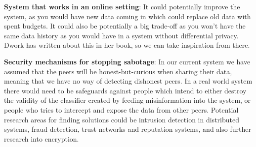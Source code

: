 \vspace{2mm}
\noindent
\textbf{System that works in an online setting}: It could potentially improve the system, as you would have new data coming in which could replace old data with spent budgets. It could also be potentially a big trade-off as you won't have the same data history as you would have in a system without differential privacy. Dwork has written about this in her book, so we can take inspiration from there. 

\vspace{2mm}
\noindent
\textbf{Security mechanisms for stopping sabotage}: In our current system we have assumed that the peers will be honest-but-curious when sharing their data, meaning that we have no way of detecting dishonest peers. In a real world system there would need to be safeguards against people which intend to either destroy the validity of the classifier created by feeding misinformation into the system, or people who tries to intercept and expose the data from other peers. Potential research areas for finding solutions could be intrusion detection in distributed systems, fraud detection, trust networks and reputation systems, and also further research into encryption.  



\newpage
\listoftodos[Notes]

\cleardoublepage